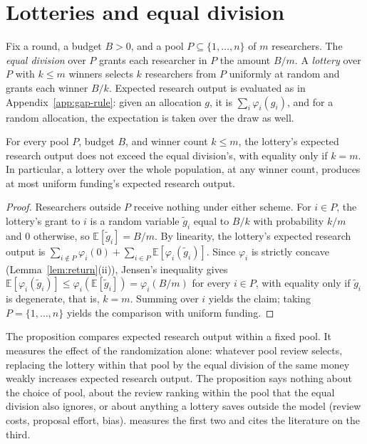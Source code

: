 \section{Lotteries and equal division}\label{app:lottery}

Fix a round, a budget $B > 0$, and a pool $P \subseteq \{1, \ldots, n\}$ of $m$ researchers. The \emph{equal division} over $P$ grants each researcher in $P$ the amount $B/m$. A \emph{lottery} over $P$ with $k \leq m$ winners selects $k$ researchers from $P$ uniformly at random and grants each winner $B/k$. Expected research output is evaluated as in Appendix~\ref{app:gap-rule}: given an allocation $g$, it is $\sum_i \varphi_i(g_i)$, and for a random allocation, the expectation is taken over the draw as well.

\begin{prop}\label{prop:lottery}
For every pool $P$, budget $B$, and winner count $k \leq m$, the lottery's expected research output does not exceed the equal division's, with equality only if $k = m$. In particular, a lottery over the whole population, at any winner count, produces at most uniform funding's expected research output.
\end{prop}

\begin{proof}
Researchers outside $P$ receive nothing under either scheme. For $i \in P$, the lottery's grant to $i$ is a random variable $\tilde g_i$ equal to $B/k$ with probability $k/m$ and $0$ otherwise, so $\mathbb{E}[\tilde g_i] = B/m$. By linearity, the lottery's expected research output is $\sum_{i \notin P} \varphi_i(0) + \sum_{i \in P} \mathbb{E}[\varphi_i(\tilde g_i)]$. Since $\varphi_i$ is strictly concave (Lemma~\ref{lem:return}(ii)), Jensen's inequality gives $\mathbb{E}[\varphi_i(\tilde g_i)] \leq \varphi_i(\mathbb{E}[\tilde g_i]) = \varphi_i(B/m)$ for every $i \in P$, with equality only if $\tilde g_i$ is degenerate, that is, $k = m$. Summing over $i$ yields the claim; taking $P = \{1, \ldots, n\}$ yields the comparison with uniform funding.
\end{proof}

\begin{remark}
The proposition compares expected research output within a fixed pool. It measures the effect of the randomization alone: whatever pool review selects, replacing the lottery within that pool by the equal division of the same money weakly increases expected research output. The proposition says nothing about the choice of pool, about the review ranking within the pool that the equal division also ignores, or about anything a lottery saves outside the model (review costs, proposal effort, bias).  measures the first two and cites the literature on the third.
\end{remark}

